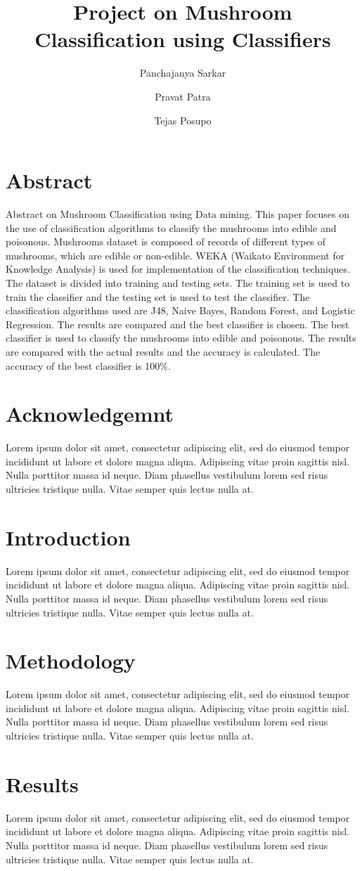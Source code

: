 \documentclass[a4paper,11pt]{article}
\title{Project on Mushroom Classification using Classifiers}
\author[a]{Panchajanya Sarkar}
\author[b]{Pravat Patra}
\author[c]{Tejas Posupo}
\affiliation[*]{Central University of Rajasthan,\\
  NH-8, Ajmer, 305817, India}
\begin{document}
    \maketitle
        \section{Abstract}
            Abstract on Mushroom Classification using Data mining.
            This paper focuses on the use of classification algorithms to classify the mushrooms into edible and poisonous. Mushrooms dataset is composed of records of different types of mushrooms, which are edible or non-edible. WEKA (Waikato Environment for Knowledge Analysis) is used for implementation of the classification techniques. The dataset is divided into training and testing sets. The training set is used to train the classifier and the testing set is used to test the classifier. The classification algorithms used are J48, Naive Bayes, Random Forest, and Logistic Regression. The results are compared and the best classifier is chosen. The best classifier is used to classify the mushrooms into edible and poisonous. The results are compared with the actual results and the accuracy is calculated. The accuracy of the best classifier is 100\%.
        \section{Acknowledgemnt}
            Lorem ipsum dolor sit amet, consectetur adipiscing elit, sed do eiusmod tempor incididunt ut labore et dolore magna aliqua. Adipiscing vitae proin sagittis nisl. Nulla porttitor massa id neque. Diam phasellus vestibulum lorem sed risus ultricies tristique nulla. Vitae semper quis lectus nulla at.
        \section{Introduction}
            Lorem ipsum dolor sit amet, consectetur adipiscing elit, sed do eiusmod tempor incididunt ut labore et dolore magna aliqua. Adipiscing vitae proin sagittis nisl. Nulla porttitor massa id neque. Diam phasellus vestibulum lorem sed risus ultricies tristique nulla. Vitae semper quis lectus nulla at.
        \section{Methodology}
            Lorem ipsum dolor sit amet, consectetur adipiscing elit, sed do eiusmod tempor incididunt ut labore et dolore magna aliqua. Adipiscing vitae proin sagittis nisl. Nulla porttitor massa id neque. Diam phasellus vestibulum lorem sed risus ultricies tristique nulla. Vitae semper quis lectus nulla at.
        \section{Results}
            Lorem ipsum dolor sit amet, consectetur adipiscing elit, sed do eiusmod tempor incididunt ut labore et dolore magna aliqua. Adipiscing vitae proin sagittis nisl. Nulla porttitor massa id neque. Diam phasellus vestibulum lorem sed risus ultricies tristique nulla. Vitae semper quis lectus nulla at.
            
\end{document}
